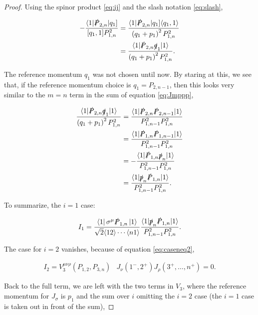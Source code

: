 \documentclass{article}
\theoremstyle{definition}
\numberwithin{equation}{section}
\begin{document}
\begin{proof}
    Using the spinor product \eqref{eq:ij} and the slash notation \eqref{eq:slash},

    \begin{align*}
        - \frac{ \langle 1 | \slashed{P}_{2,n} | q_1 \rbrack }{ \lbrack q_1,1 \rbrack P_{1,n}^2 } &= \frac{ \langle 1 | \slashed{P}_{2,n} | q_1 \rbrack \langle q_1,1 \rangle }{ \left( q_1 + p_1 \right)^2 P_{1,n}^2 } \\
        &= \frac{ \langle 1 | \slashed{P}_{2,n} \slashed{q}_1 | 1 \rangle }{ \left( q_1 + p_1 \right)^2 P_{1,n}^2 }.
    \end{align*}

    The reference momentum $q_1$ was not chosen until now. By staring at this, we see that, if the reference momentum choice is $q_1 = P_{2,n-1}$, then this looks very similar to the $m=n$ term in the sum of equation \eqref{eq:Jmppp},

    \begin{align*}
        \frac{ \langle 1 | \slashed{P}_{2,n} \slashed{q}_1 | 1 \rangle }{ \left( q_1 + p_1 \right)^2 P_{1,n}^2 } &= \frac{ \langle 1 | \slashed{P}_{2,n} \slashed{P}_{2,n-1} | 1 \rangle }{ P_{1,n-1}^2 P_{1,n}^2 } \\
        &= \frac{ \langle 1 | \slashed{P}_{1,n} \slashed{P}_{1,n-1} | 1 \rangle }{ P_{1,n-1}^2 P_{1,n}^2 } \\
        &= - \frac{ \langle 1 | \slashed{P}_{1,n} \slashed{p}_{n} | 1 \rangle }{ P_{1,n-1}^2 P_{1,n}^2 } \\
        &= \frac{ \langle 1 | \slashed{p}_{n} \slashed{P}_{1,n} | 1 \rangle }{ P_{1,n-1}^2 P_{1,n}^2 }.
    \end{align*}

    To summarize, the $i=1$ case:

    \begin{align}
        I_1 = \frac{ \bra{1} \sigma^{\mu} \slashed{P}_{1,n} \ket{1} }{ \sqrt{2} \langle 12 \rangle \cdots \langle n1 \rangle } \frac{ \langle 1 | \slashed{p}_{n} \slashed{P}_{1,n} | 1 \rangle }{ P_{1,n-1}^2 P_{1,n}^2 }. \label{eq:I1}
    \end{align}

    The case for $i=2$ vanishes, because of equation \eqref{eq:caseneq2},

    \begin{align*}
        I_2 = V_3^{\mu \nu \rho}(P_{1,2}, P_{3,n}) &J_{\nu}(1^{-}, 2^{+}) J_{\rho}(3^{+}, \dots , n^{+})  = 0.
    \end{align*}

    Back to the full term, we are left with the two terms in $V_3$, where the reference momentum for $J_{\sigma}$ is $p_1$ and the sum over $i$ omitting the $i=2$ case (the $i=1$ case is taken out in front of the sum),


\end{proof}
\end{document}

